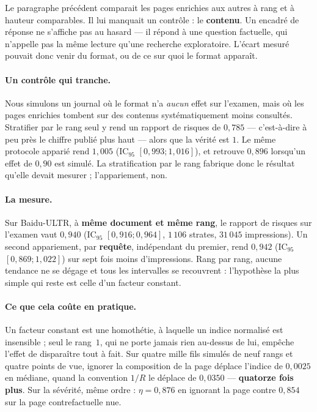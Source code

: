\documentclass[11pt,a4paper]{article}
\begin{document}
Le paragraphe précédent comparait les pages enrichies aux autres à rang et à hauteur comparables.
Il lui manquait un contrôle : le \textbf{contenu}. Un encadré de réponse ne s'affiche pas au
hasard --- il répond à une question factuelle, qui n'appelle pas la même lecture qu'une recherche
exploratoire. L'écart mesuré pouvait donc venir du format, ou de ce sur quoi le format apparaît.

\paragraph{Un contrôle qui tranche.} Nous simulons un journal où le format n'a \emph{aucun} effet
sur l'examen, mais où les pages enrichies tombent sur des contenus systématiquement moins
consultés. Stratifier par le rang seul y rend un rapport de risques de $0{,}785$ --- c'est-à-dire
à peu près le chiffre publié plus haut --- alors que la vérité est $1$. Le même protocole apparié
rend $1{,}005$ (IC$_{95}$ $[0{,}993 ; 1{,}016]$), et retrouve $0{,}896$ lorsqu'un effet de
$0{,}90$ est simulé. La stratification par le rang fabrique donc le résultat qu'elle devait
mesurer ; l'appariement, non.

\paragraph{La mesure.} Sur Baidu-ULTR, à \textbf{même document et même rang}, le rapport de
risques sur l'examen vaut $0{,}940$ (IC$_{95}$ $[0{,}916 ; 0{,}964]$, $1\,106$ strates,
$31\,045$ impressions). Un second appariement, par \textbf{requête}, indépendant du premier, rend
$0{,}942$ (IC$_{95}$ $[0{,}869 ; 1{,}022]$) sur sept fois moins d'impressions. Rang par rang,
aucune tendance ne se dégage et tous les intervalles se recouvrent : l'hypothèse la plus simple
qui reste est celle d'un facteur constant.

\paragraph{Ce que cela coûte en pratique.} Un facteur constant est une homothétie, à laquelle un
indice normalisé est insensible ; seul le rang~$1$, qui ne porte jamais rien au-dessus de lui,
empêche l'effet de disparaître tout à fait. Sur quatre mille fils simulés de neuf rangs et quatre
points de vue, ignorer la composition de la page déplace l'indice de $0{,}0025$ en médiane, quand
la convention $1/R$ le déplace de $0{,}0350$ --- \textbf{quatorze fois plus}. Sur la sévérité,
même ordre : $\eta = 0{,}876$ en ignorant la page contre $0{,}854$ sur la page contrefactuelle
nue.
\end{document}
